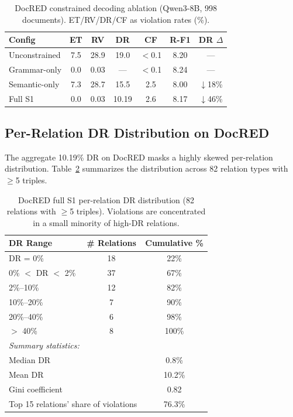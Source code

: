 \documentclass[11pt,a4paper]{article}
\begin{document}
\begin{table}[t]
\centering
\small
\caption{DocRED constrained decoding ablation (Qwen3-8B, 998 documents). ET/RV/DR/CF as violation rates (\%).}
\label{tab:docred}
\begin{tabular}{lcccccc}
\toprule
\textbf{Config} & \textbf{ET} & \textbf{RV} & \textbf{DR} & \textbf{CF} & \textbf{R-F1} & \textbf{DR $\Delta$} \\
\midrule
Unconstrained   & 7.5  & 28.9 & 19.0 & $<$0.1 & 8.20 & --- \\
Grammar-only    & 0.0  & 0.03 & ---  & $<$0.1 & 8.24 & --- \\
Semantic-only   & 7.3  & 28.7 & 15.5 & 2.5  & 8.00 & $\downarrow$18\% \\
Full S1         & 0.0  & 0.03 & 10.19 & 2.6  & 8.17 & $\downarrow$46\% \\
\bottomrule
\end{tabular}
\end{table}

\subsection{Per-Relation DR Distribution on DocRED}
\label{sec:bimodal}

The aggregate 10.19\% DR on DocRED masks a highly skewed per-relation distribution.
Table~\ref{tab:bimodal} summarizes the distribution across 82 relation types with $\geq$5 triples.

\begin{table}[t]
\centering
\small
\caption{DocRED full S1 per-relation DR distribution (82 relations with $\geq$5 triples). Violations are concentrated in a small minority of high-DR relations.}
\label{tab:bimodal}
\begin{tabular}{lcc}
\toprule
\textbf{DR Range} & \textbf{\# Relations} & \textbf{Cumulative \%} \\
\midrule
DR = 0\%      & 18 & 22\% \\
0\% $<$ DR $<$ 2\%   & 37 & 67\% \\
2\%--10\%     & 12 & 82\% \\
10\%--20\%    & 7  & 90\% \\
20\%--40\%    & 6  & 98\% \\
$>$ 40\%      & 8  & 100\% \\
\midrule
\multicolumn{3}{l}{\textit{Summary statistics:}} \\
\multicolumn{2}{l}{Median DR} & 0.8\% \\
\multicolumn{2}{l}{Mean DR} & 10.2\% \\
\multicolumn{2}{l}{Gini coefficient} & 0.82 \\
\multicolumn{2}{l}{Top 15 relations' share of violations} & 76.3\% \\
\bottomrule
\end{tabular}
\end{table}
\end{document}
